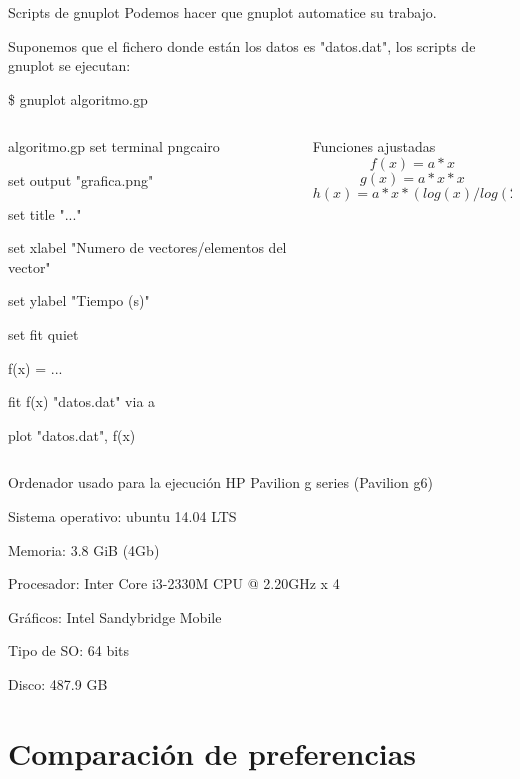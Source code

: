 \documentclass[compress]{beamer}
\begin{document}
\begin{frame}
	\begin{block}{Scripts de gnuplot}
		Podemos hacer que gnuplot automatice su trabajo.
		
		Suponemos que el fichero donde están los datos es "datos.dat", los scripts de 				gnuplot se ejecutan:
		
		\hspace{2cm}\$ gnuplot algoritmo.gp
	\end{block}
	\pause
	
	\begin{columns}

	\begin{column}{5cm}
	\begin{exampleblock}{algoritmo.gp}
	set terminal pngcairo
	
	set output "grafica.png"

	set title "..."

	set xlabel "Numero de vectores/elementos del vector"

	set ylabel "Tiempo (s)"

	set fit quiet

	f(x) = ...

	fit f(x) "datos.dat" via a

	plot "datos.dat", f(x)
	\end{exampleblock}
	\end{column}
	\pause
	
	\begin{column}{5cm}
	\begin{block}{Funciones ajustadas}
		\[f(x) = a*x\]
		\[g(x) = a*x*x\]
		\[h(x) = a*x*(log(x)/log(2))\]
	\end{block}
	\end{column}
	
	\end{columns}
\end{frame}

\begin{frame}
	\begin{alertblock}{Ordenador usado para la ejecuci\'on}
	HP Pavilion g series (Pavilion g6)

	Sistema operativo: ubuntu 14.04 LTS

	Memoria: 3.8 GiB (4Gb)

	Procesador: Inter Core i3-2330M CPU @ 2.20GHz x 4

	Gráficos: Intel Sandybridge Mobile

	Tipo de SO: 64 bits

	Disco: 487.9 GB	
	\end{alertblock}
\end{frame}



















\section{Comparación de preferencias}

\end{document}
